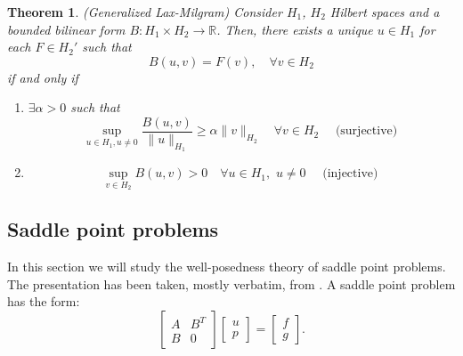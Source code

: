 \documentclass{article}
\newtheorem{theorem}{Theorem}
\begin{document}
\begin{theorem}(Generalized Lax-Milgram)
    Consider \(H_1\), \(H_2\) Hilbert spaces and a bounded bilinear form 
    \(B:H_1\times H_2 \to \mathbb{R}\). Then, there exists a unique \(u\in H_1\) for each 
    \(F\in H_2'\) such that \[B(u,v) = F(v),\quad \forall v \in H_2\] if and only if 
    \begin{enumerate}
        \item \(\exists \alpha > 0\) such that \[\sup_{u\in H_1,u\neq 0}
        \frac{B(u,v)}{\lVert u \rVert_{H_1}} \ge \alpha \lVert v \rVert_{H_2}
        \quad \forall v\in H_2\quad \text{ (surjective) }\]
        \item \[\sup_{v\in H_2} B(u,v) > 0 
        \quad \forall u\in H_1,\,\, u\neq 0
        \quad \text{ (injective) }\]
    \end{enumerate}
\end{theorem}

\subsection{Saddle point problems}

In this section we will study the well-posedness theory of saddle point problems. The presentation has been taken, mostly verbatim, from \cite{gatica2014simple}. A saddle point problem has the form:
\begin{displaymath}
    \begin{bmatrix}
        A & B^{T}\\ 
        B & 0
    \end{bmatrix}
    \begin{bmatrix}
        u \\ p
    \end{bmatrix}
    =
    \begin{bmatrix}
        f \\ g
    \end{bmatrix}.
\end{displaymath}
\end{document}
